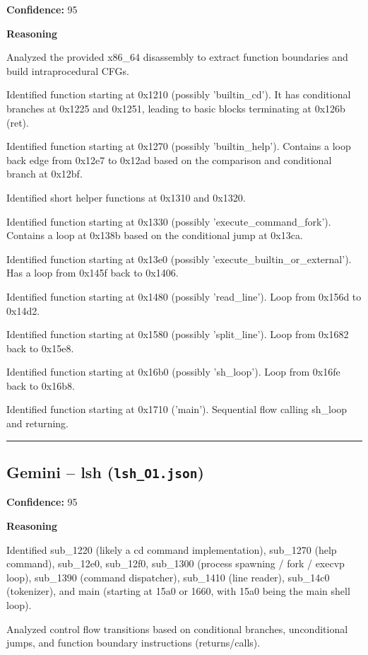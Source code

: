 \textbf{Confidence:} 95

\textbf{Reasoning}

Analyzed the provided x86\_64 disassembly to extract function boundaries and build intraprocedural CFGs.

Identified function starting at 0x1210 (possibly 'builtin\_cd'). It has conditional branches at 0x1225 and 0x1251, leading to basic blocks terminating at 0x126b (ret).

Identified function starting at 0x1270 (possibly 'builtin\_help'). Contains a loop back edge from 0x12e7 to 0x12ad based on the comparison and conditional branch at 0x12bf.

Identified short helper functions at 0x1310 and 0x1320.

Identified function starting at 0x1330 (possibly 'execute\_command\_fork'). Contains a loop at 0x138b based on the conditional jump at 0x13ca.

Identified function starting at 0x13e0 (possibly 'execute\_builtin\_or\_external'). Has a loop from 0x145f back to 0x1406.

Identified function starting at 0x1480 (possibly 'read\_line'). Loop from 0x156d to 0x14d2.

Identified function starting at 0x1580 (possibly 'split\_line'). Loop from 0x1682 back to 0x15e8.

Identified function starting at 0x16b0 (possibly 'sh\_loop'). Loop from 0x16fe back to 0x16b8.

Identified function starting at 0x1710 ('main'). Sequential flow calling sh\_loop and returning.

\bigskip
\hrule
\bigskip

\subsection{Gemini -- lsh (\texttt{lsh\_O1.json})}

\textbf{Confidence:} 95

\textbf{Reasoning}

Identified sub\_1220 (likely a cd command implementation), sub\_1270 (help command), sub\_12e0, sub\_12f0, sub\_1300 (process spawning / fork / execvp loop), sub\_1390 (command dispatcher), sub\_1410 (line reader), sub\_14c0 (tokenizer), and main (starting at 15a0 or 1660, with 15a0 being the main shell loop).

Analyzed control flow transitions based on conditional branches, unconditional jumps, and function boundary instructions (returns/calls).

